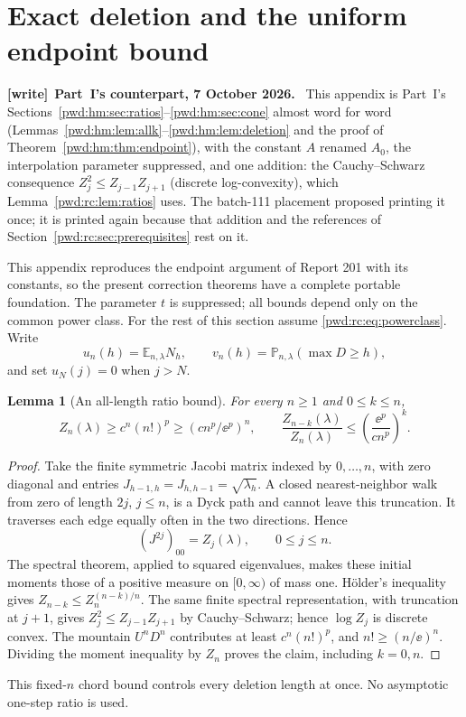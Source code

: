 \documentclass[11pt,letterpaper]{article}
\numberwithin{equation}{section}
\newtheorem{lemma}[theorem]{Lemma}
\theoremstyle{remark}\newtheorem{remark}[theorem]{Remark}
\newcommand{\E}{\mathbb E}\newcommand{\Prob}{\mathbb P}
\newenvironment{writenote}[1][]{\par\smallskip\begingroup\small
 \noindent\textbf{[write]}\if\relax\detokenize{#1}\relax\else~\textbf{#1.}\fi\ }%
 {\par\endgroup\smallskip}
\newcounter{pwdsavesec}
\begin{document}
\setcounter{pwdsavesec}{\value{section}}\setcounter{section}{0}
\section{Exact deletion and the uniform endpoint bound}\label{pwd:rc:app:endpoint}
\begin{writenote}[Part~I's counterpart, 7 October 2026]
This appendix is Part~I's Sections~\ref{pwd:hm:sec:ratios}--\ref{pwd:hm:sec:cone}
almost word for word (Lemmas~\ref{pwd:hm:lem:allk}--\ref{pwd:hm:lem:deletion}
and the proof of Theorem~\ref{pwd:hm:thm:endpoint}), with the constant $A$
renamed $A_0$, the interpolation parameter suppressed, and one addition: the
Cauchy--Schwarz consequence $Z_j^2\le Z_{j-1}Z_{j+1}$ (discrete log-convexity),
which Lemma~\ref{pwd:rc:lem:ratios} uses. The batch-111 placement proposed
printing it once; it is printed again because that addition and the
references of Section~\ref{pwd:rc:sec:prerequisites} rest on it.
\end{writenote}
This appendix reproduces the endpoint argument of Report 201 with its constants, so the present correction theorems have a complete portable foundation. The parameter $t$ is suppressed; all bounds depend only on the common power class.
For the rest of this section assume \eqref{pwd:rc:eq:powerclass}. Write
\[
 u_n(h)=\E_{n,\lambda}N_h,\qquad
 v_n(h)=\Prob_{n,\lambda}(\max D\ge h),
\]
and set $u_N(j)=0$ when $j>N$.

\begin{lemma}[An all-length ratio bound]\label{pwd:rc:lem:allk}
For every $n\ge1$ and $0\le k\le n$,
\begin{equation}\label{pwd:rc:eq:allk}
 Z_n(\lambda)\ge c^n(n!)^p\ge(cn^p/\ee^p)^n,
 \qquad
 \frac{Z_{n-k}(\lambda)}{Z_n(\lambda)}
 \le\left(\frac{\ee^p}{cn^p}\right)^k.
\end{equation}
\end{lemma}
\begin{proof}
Take the finite symmetric Jacobi matrix indexed by $0,\ldots,n$, with zero diagonal and entries $J_{h-1,h}=J_{h,h-1}=\sqrt{\lambda_h}$. A closed nearest-neighbor walk from zero of length $2j$, $j\le n$, is a Dyck path and cannot leave this truncation. It traverses each edge equally often in the two directions. Hence
\[
 (J^{2j})_{00}=Z_j(\lambda),\qquad 0\le j\le n.
\]
The spectral theorem, applied to squared eigenvalues, makes these initial moments those of a positive measure on $[0,\infty)$ of mass one. H\"older's inequality gives $Z_{n-k}\le Z_n^{(n-k)/n}$. The same finite spectral representation, with truncation at $j+1$, gives $Z_j^2\le Z_{j-1}Z_{j+1}$ by Cauchy--Schwarz; hence $\log Z_j$ is discrete convex. The mountain $U^nD^n$ contributes at least $c^n(n!)^p$, and $n!\ge(n/\ee)^n$. Dividing the moment inequality by $Z_n$ proves the claim, including $k=0,n$.
\end{proof}
This fixed-$n$ chord bound controls every deletion length at once. No asymptotic one-step ratio is used.
\end{document}
